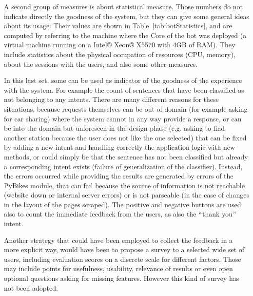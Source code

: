 A second group of measures is about statistical measure. Those numbers do not indicate directly the goodness of the system, but they can give some general ideas about its usage. Their values are shown in Table~\ref{tab:botStatistics}, and are computed by referring to the machine where the Core of the bot was deployed (a virtual machine running on a Intel® Xeon® X5570 with 4GB of RAM). They include statistics about the physical occupation of resources (CPU, memory), about the sessions with the users, and also some other measures.

In this last set, some can be used as indicator of the goodness of the experience with the system. For example the count of sentences that have been classified as not belonging to any intents. There are many different reasons for these situations, because requests themselves can be out of domain (for example asking for car sharing) where the system cannot in any way provide a response, or can be into the domain but unforeseen in the design phase (e.g. asking to find another station because the user does not like the one selected) that can be fixed by adding a new intent and handling correctly the application logic with new methods, or could simply be that the sentence has not been classified but already a corresponding intent exists (failure of generalization of the classifier). Instead, the errors occurred while providing the results are generated by errors of the PyBikes module, that can fail because the source of information is not reachable (website down or internal server errors) or is not parseable (in the case of changes in the layout of the pages scraped). The positive and negative buttons are used also to count the immediate feedback from the users, as also the $``$thank you$"$  intent.

Another strategy that could have been employed to collect the feedback in a more explicit way, would have been to propose a survey to a selected wide set of users, including evaluation scores on a discrete scale for different factors. Those may include points for usefulness, usability, relevance of results or even open optional questions asking for missing features. However this kind of survey has not been adopted.


